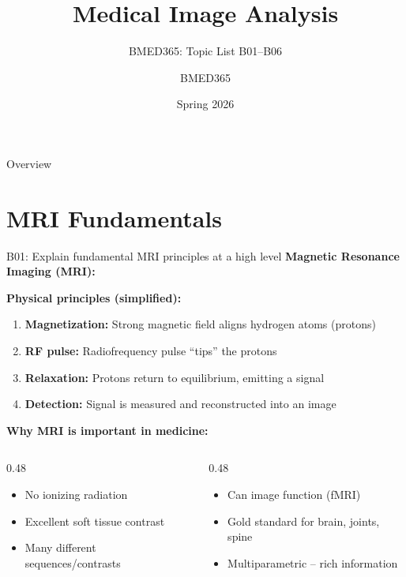 \documentclass[aspectratio=169, 10pt]{beamer}
\title{Medical Image Analysis}
\subtitle{BMED365: Topic List B01--B06}
\author{BMED365}
\date{Spring 2026}
\begin{document}
\begin{frame}
    \titlepage
\end{frame}

\begin{frame}{Overview}
    \tableofcontents
\end{frame}

\section{MRI Fundamentals}

\begin{frame}{B01: Explain fundamental MRI principles at a high level}
    \textbf{Magnetic Resonance Imaging (MRI):}
    
    \vspace{0.3cm}
    \textbf{Physical principles (simplified):}
    \begin{enumerate}
        \item \textbf{Magnetization:} Strong magnetic field aligns hydrogen atoms (protons)
        \item \textbf{RF pulse:} Radiofrequency pulse ``tips'' the protons
        \item \textbf{Relaxation:} Protons return to equilibrium, emitting a signal
        \item \textbf{Detection:} Signal is measured and reconstructed into an image
    \end{enumerate}
    
    \vspace{0.3cm}
    \textbf{Why MRI is important in medicine:}
    \begin{columns}[T]
        \begin{column}{0.48\textwidth}
            \begin{itemize}
                \item No ionizing radiation
                \item Excellent soft tissue contrast
                \item Many different sequences/contrasts
            \end{itemize}
        \end{column}
        \begin{column}{0.48\textwidth}
            \begin{itemize}
                \item Can image function (fMRI)
                \item Gold standard for brain, joints, spine
                \item Multiparametric -- rich information
            \end{itemize}
        \end{column}
    \end{columns}
    

\end{frame}
\end{document}
